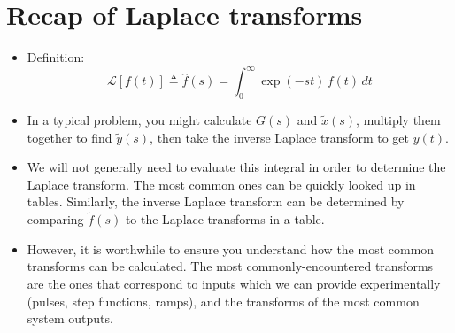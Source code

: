 \documentclass{article}
\newcommand{\Lapl}{\mathcal{L}}
\begin{document}
\section*{Recap of Laplace transforms}

\begin{itemize}
\item Definition:
\[ \Lapl \left[ f(t) \right] \triangleq \hat{f}(s) = \int_0^{\infty} \exp \left(-st \right) \, f(t) \, dt\]
\item In a typical problem, you might calculate $G(s)$ and $\tilde{x}(s)$, multiply them together to find $\tilde{y}(s)$, then take the inverse Laplace transform to get $y(t)$.
\item We will not generally need to evaluate this integral in order to determine the Laplace transform. The most common ones can be quickly looked up in tables. Similarly, the inverse Laplace transform can be determined by comparing $\tilde{f}(s)$ to the Laplace transforms in a table.
\item However, it is worthwhile to ensure you understand how the most common transforms can be calculated. The most commonly-encountered transforms are the ones that correspond to inputs which we can provide experimentally (pulses, step functions, ramps), and the transforms of the most common system outputs.
\end{itemize}
\end{document}
